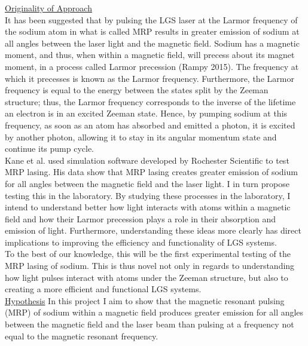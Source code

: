\documentclass{article}
\begin{document}
\underline{Originality of Approach}\\
It has been suggested that by pulsing the LGS laser at the Larmor frequency of the sodium atom in what is called MRP results in greater emission of sodium at all angles between the laser light and the magnetic field. Sodium has a magnetic moment, and thus, when within a magnetic field, will precess about its magnet moment, in a process called Larmor precession (Rampy 2015). The frequency at which it precesses is known as the Larmor frequency. Furthermore, the Larmor frequency is equal to the energy between the states split by the Zeeman structure; thus, the Larmor frequency corresponds to the inverse of the lifetime an electron is in an excited Zeeman state. Hence, by pumping sodium at this frequency, as soon as an atom has absorbed and emitted a photon, it is excited by another photon, allowing it to stay in its angular momentum state and continue its pump cycle.\\
Kane et al. used simulation software developed by Rochester Scientific to test MRP lasing. His data show that MRP lasing creates greater emission of sodium for all angles between the magnetic field and the laser light. I in turn propose testing this in the laboratory. By studying these processes in the laboratory, I intend to understand better how light interacts with atoms within a magnetic field and how their Larmor precession plays a role in their absorption and emission of light. Furthermore, understanding these ideas more clearly has direct implications to improving the efficiency and functionality of LGS systems.\\
To the best of our knowledge, this will be the first experimental testing of the MRP lasing of sodium. This is thus novel not only in regards to understanding how light pulses interact with atoms under the Zeeman structure, but also to creating a more efficient and functional LGS systems.\\
\underline{Hypothesis}
In this project I aim to show that the magnetic resonant pulsing (MRP) of sodium within a magnetic field produces greater emission for all angles between the magnetic field and the laser beam than pulsing at a frequency not equal to the magnetic resonant frequency.\\
\end{document}
